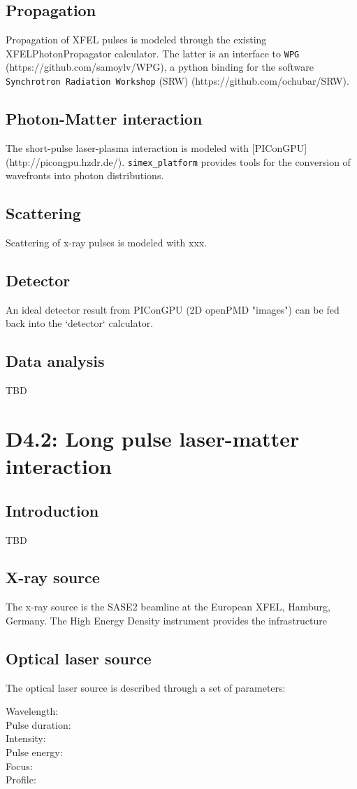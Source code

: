 \documentclass[a4paper]{article}
\begin{document}
\subsection{Propagation}
Propagation of XFEL pulses is modeled through the existing XFELPhotonPropagator calculator. The latter is an interface
to \texttt{WPG} (https://github.com/samoylv/WPG), a python binding for the software \texttt{Synchrotron Radiation Workshop} (SRW)
(https://github.com/ochubar/SRW).
\subsection{Photon-Matter interaction}
The short-pulse laser-plasma interaction is modeled with [PIConGPU](http://picongpu.hzdr.de/).
\texttt{simex\_platform} provides tools for the conversion of wavefronts into photon distributions.
\subsection{Scattering}
Scattering of x-ray pulses is modeled with xxx.
\subsection{Detector}
An ideal detector result from PIConGPU (2D openPMD "images") can be fed back into the `detector` calculator.
\subsection{Data analysis}
TBD

\section{D4.2: Long pulse laser-matter interaction\label{sec:long_pulse}}
\subsection{Introduction}
TBD
\subsection{X-ray source}
The x-ray source is the SASE2 beamline at the European XFEL, Hamburg, Germany. The High Energy Density instrument \cite{} provides the infrastructure
\subsection{Optical laser source}
The optical laser source is described through a set of parameters:
\begin{description}
  \item[Wavelength:]
  \item[Pulse duration:]
  \item[Intensity:]
  \item[Pulse energy:]
  \item[Focus:]
  \item[Profile:]
\end{description}
\end{document}
